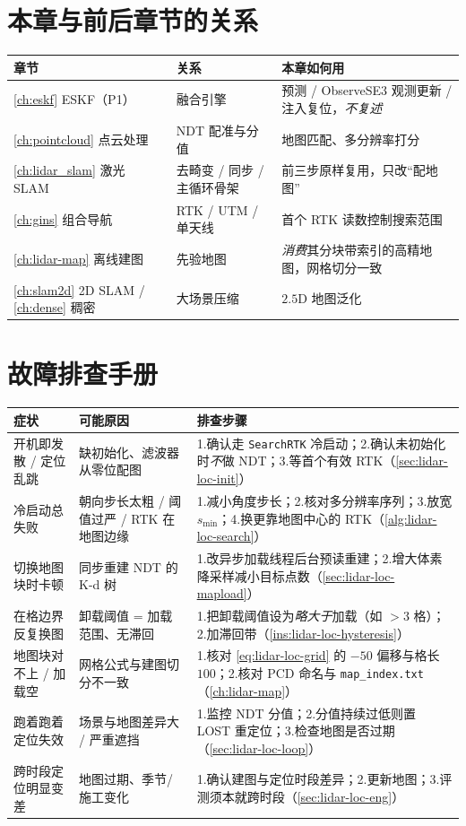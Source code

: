 \section*{本章与前后章节的关系}
\begin{table}[H]\centering\small
\begin{tabular}{lll}
\toprule
章节 & 关系 & 本章如何用 \\
\midrule
\cref{ch:eskf} ESKF（P1） & 融合引擎 & 预测 / ObserveSE3 观测更新 / 注入复位，\emph{不复述} \\
\cref{ch:pointcloud} 点云处理 & NDT 配准与分值 & 地图匹配、多分辨率打分 \\
\cref{ch:lidar_slam} 激光 SLAM & 去畸变 / 同步 / 主循环骨架 & 前三步原样复用，只改“配地图” \\
\cref{ch:gins} 组合导航 & RTK / UTM / 单天线 & 首个 RTK 读数控制搜索范围 \\
\cref{ch:lidar-map} 离线建图 & 先验地图 & \emph{消费}其分块带索引的高精地图，网格切分一致 \\
\cref{ch:slam2d} 2D SLAM / \cref{ch:dense} 稠密 & 大场景压缩 & $2.5$D 地图泛化 \\
\bottomrule
\end{tabular}
\end{table}

\section*{故障排查手册}
\begin{table}[H]\centering\small
\begin{tabular}{p{} p{} p{}}
\toprule
症状 & 可能原因 & 排查步骤 \\
\midrule
开机即发散 / 定位乱跳 & 缺初始化、滤波器从零位配图 & 1.确认走 \texttt{SearchRTK} 冷启动；2.确认未初始化时\emph{不}做 NDT；3.等首个有效 RTK（\cref{sec:lidar-loc-init}）\\
冷启动总失败 & 朝向步长太粗 / 阈值过严 / RTK 在地图边缘 & 1.减小角度步长；2.核对多分辨率序列；3.放宽 $s_{\min}$；4.换更靠地图中心的 RTK（\cref{alg:lidar-loc-search}）\\
切换地图块时卡顿 & 同步重建 NDT 的 K-d 树 & 1.改异步加载线程后台预读重建；2.增大体素降采样减小目标点数（\cref{sec:lidar-loc-mapload}）\\
在格边界反复换图 & 卸载阈值 = 加载范围、无滞回 & 1.把卸载阈值设为\emph{略大于}加载（如 $>3$ 格）；2.加滞回带（\cref{ins:lidar-loc-hysteresis}）\\
地图块对不上 / 加载空 & 网格公式与建图切分不一致 & 1.核对 \cref{eq:lidar-loc-grid} 的 $-50$ 偏移与格长 $100$；2.核对 PCD 命名与 \texttt{map\_index.txt}（\cref{ch:lidar-map}）\\
跑着跑着定位失效 & 场景与地图差异大 / 严重遮挡 & 1.监控 NDT 分值；2.分值持续过低则置 \textsf{LOST} 重定位；3.检查地图是否过期（\cref{sec:lidar-loc-loop}）\\
跨时段定位明显变差 & 地图过期、季节/施工变化 & 1.确认建图与定位时段差异；2.更新地图；3.评测须本就跨时段（\cref{sec:lidar-loc-eng}）\\
\bottomrule
\end{tabular}
\end{table}

